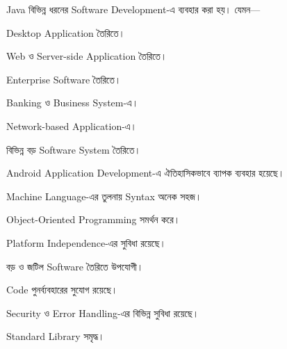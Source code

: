 
Java বিভিন্ন ধরনের Software Development-এ ব্যবহার করা হয়। যেমন—

\begin{compacttwocolpoints}

\item Desktop Application তৈরিতে।

\item Web ও Server-side Application তৈরিতে।

\item Enterprise Software তৈরিতে।

\item Banking ও Business System-এ।

\item Network-based Application-এ।

\item বিভিন্ন বড় Software System তৈরিতে।

\item Android Application Development-এ ঐতিহাসিকভাবে ব্যাপক ব্যবহার হয়েছে।

\end{compacttwocolpoints}


\begin{compacttwocolpoints}

\item Machine Language-এর তুলনায় Syntax অনেক সহজ।

\item Object-Oriented Programming সমর্থন করে।

\item Platform Independence-এর সুবিধা রয়েছে।

\item বড় ও জটিল Software তৈরিতে উপযোগী।

\item Code পুনর্ব্যবহারের সুযোগ রয়েছে।

\item Security ও Error Handling-এর বিভিন্ন সুবিধা রয়েছে।

\item Standard Library সমৃদ্ধ।

\end{compacttwocolpoints}

